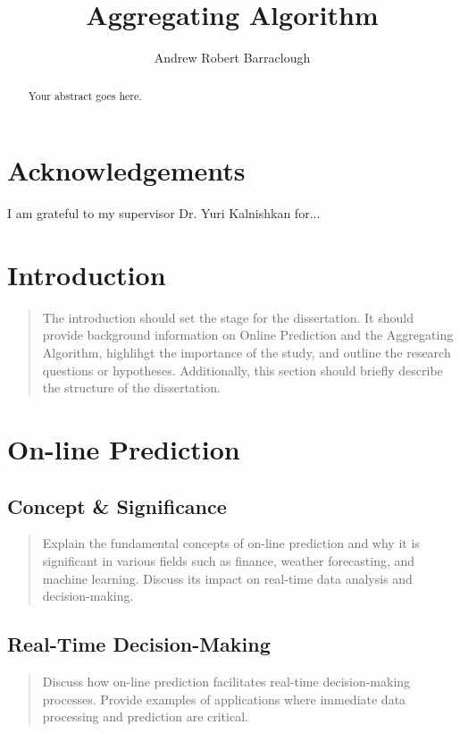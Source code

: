 \documentclass[11pt]{article} %
\title{Aggregating Algorithm}
\author{Andrew Robert Barraclough}
\theoremstyle{plain}
\theoremstyle{definition}
\begin{document}
\maketitle

\declaration

\begin{abstract}
  Your abstract goes here.
\end{abstract}

\section*{Acknowledgements}
I am grateful to my supervisor Dr. Yuri Kalnishkan for...

\newpage

\section{Introduction}
\begin{quote}
  The introduction should set the stage for the dissertation. It should provide background information on Online Prediction and the Aggregating Algorithm, highlihgt the importance of the study, and outline the research questions or hypotheses. Additionally, this section should briefly describe the structure of the dissertation.
\end{quote}

\newpage

\section{On-line Prediction}
\subsection{Concept \& Significance}
\begin{quote}
  Explain the fundamental concepts of on-line prediction and why it is significant in various fields such as finance, weather forecasting, and machine learning. Discuss its impact on real-time data analysis and decision-making.
\end{quote}

\subsection{Real-Time Decision-Making}
\begin{quote}
  Discuss how on-line prediction facilitates real-time decision-making processes. Provide examples of applications where immediate data processing and prediction are critical.
\end{quote}
\end{document}
